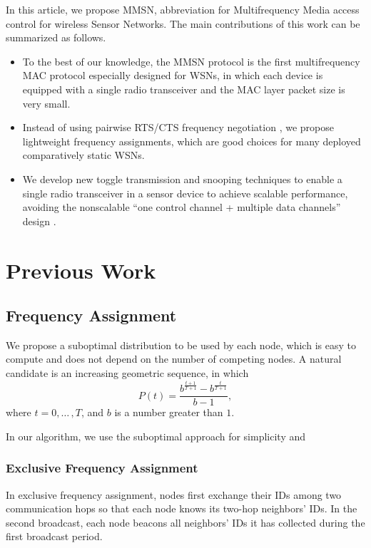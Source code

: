 \documentclass[acmtog, authorversion]{acmart}
\begin{document}
In this article, we propose MMSN, abbreviation for Multifrequency
Media access control for wireless Sensor Networks. The main
contributions of this work can be summarized as follows.
\begin{itemize}
	\item To the best of our knowledge, the MMSN protocol is the first
	multifrequency MAC protocol especially designed for WSNs, in which
	each device is equipped with a single radio transceiver and
	the MAC layer packet size is very small.
	\item Instead of using pairwise RTS/CTS frequency negotiation
	\cite{Adya-01, Culler-01, Tzamaloukas-01, Zhou-06},
	we propose lightweight frequency assignments, which are good choices
	for many deployed comparatively static WSNs.
	\item We develop new toggle transmission and snooping techniques to
	enable a single radio transceiver in a sensor device to achieve
	scalable performance, avoiding the nonscalable ``one
	control channel + multiple data channels'' design \cite{Natarajan-01}.
\end{itemize}

\section{Previous Work}

\subsection{Frequency Assignment}

We propose a suboptimal distribution to be used by each node, which is
easy to compute and does not depend on the number of competing
nodes. A natural candidate is an increasing geometric sequence, in
which
\begin{equation}
\label{eqn:01}
P(t)=\frac{b^{\frac{t+1}{T+1}}-b^{\frac{t}{T+1}}}{b-1},
\end{equation}
where $t=0,{\ldots}\,,T$, and $b$ is a number greater than $1$.

In our algorithm, we use the suboptimal approach for simplicity and


\subsubsection{Exclusive Frequency Assignment}


In exclusive frequency assignment, nodes first exchange their IDs
among two communication hops so that each node knows its two-hop
neighbors' IDs. In the second broadcast, each node beacons all
neighbors' IDs it has collected during the first broadcast period.
\end{document}
